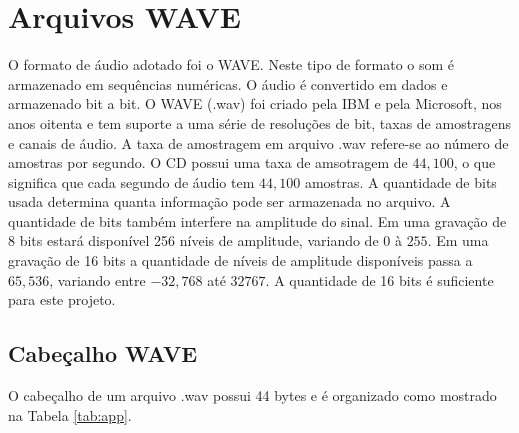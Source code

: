 \section{Arquivos WAVE}

\quad O formato de áudio adotado foi o WAVE. Neste tipo de formato o som é armazenado em sequências numéricas. O áudio é convertido em dados e armazenado bit a bit. O WAVE (.wav) foi criado pela IBM e pela Microsoft, nos anos oitenta e tem suporte a  uma série de resoluções de bit, taxas de amostragens e canais de áudio.  A taxa de amostragem em arquivo .wav refere-se ao número de amostras por segundo. O CD possui uma taxa de amsotragem de $44,100$, o que significa que cada segundo de áudio tem $44,100$ amostras. A quantidade de bits usada determina  quanta informação pode ser armazenada  no arquivo. A quantidade de bits também interfere na amplitude do sinal. Em uma gravação de 8 bits estará disponível 256 níveis de amplitude, variando de $0$ à $255$. Em uma gravação de 16 bits a quantidade de níveis de amplitude disponíveis passa a $65,536$, variando entre $-32,768$  até $32767$. A quantidade de 16 bits é suficiente para este projeto. 

\subsection{Cabeçalho WAVE}

\quad O cabeçalho de um arquivo .wav possui 44 bytes e é organizado como mostrado na Tabela \ref{tab:app}.

